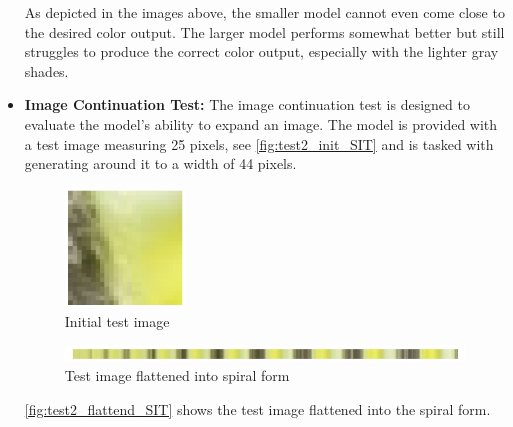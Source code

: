 \begin{itemize}
        As depicted in the images above, the smaller model cannot even come close to the desired color output. The larger model performs somewhat better but still struggles to produce the correct color output, especially with the lighter gray shades.
        
        \item \textbf{Image Continuation Test:} The image continuation test is designed to evaluate the model's ability to expand an image. The model is provided with a test image measuring 25 pixels, see \autoref{fig:test2_init_SIT} and is tasked with generating around it to a width of 44 pixels.

        \begin{figure}[H]
            \centering
            \includegraphics[width=0.3\textwidth]{imgs/ImageTest_5.0.1.0_init.png}
            \caption{Initial test image}
            \label{fig:test2_init_SIT}
        \end{figure}
        
        \begin{figure}[H]
            \centering
            \includegraphics[width=\textwidth]{imgs/ImageTest_5.0.1.0_flattend.png}
            \caption{Test image flattened into spiral form}
            \label{fig:test2_flattend_SIT}
        \end{figure}
        
        \autoref{fig:test2_flattend_SIT} shows the test image flattened into the spiral form.
        

\end{itemize}
